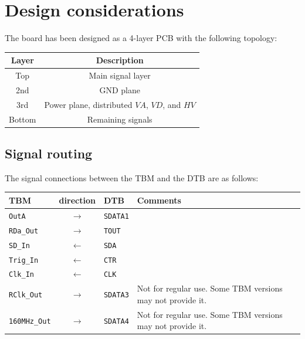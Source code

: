 \chapter{Design considerations}
The board has been designed as a 4-layer PCB with the following topology:
\begin{center}
\begin{tabular}{cc}
	\toprule %
Layer & Description \\
	\midrule %
Top & Main signal layer \\
2nd & GND plane \\
3rd & Power plane, distributed $VA$, $VD$, and $HV$ \\
Bottom & Remaining signals \\
	\bottomrule %
\end{tabular}
\end{center}

\section{Signal routing}

The signal connections between the TBM and the DTB are as follows:
\begin{center}
\begin{tabular}{lcll}
    \toprule %
    TBM & direction & DTB & Comments \\
    \midrule %
    \texttt{OutA}        & $\rightarrow$ & \texttt{SDATA1} & \\
    \texttt{RDa\_Out}    & $\rightarrow$ & \texttt{TOUT}   & \\
    \texttt{SD\_In}      & $\leftarrow$  & \texttt{SDA}    & \\
    \texttt{Trig\_In}    & $\leftarrow$  & \texttt{CTR}    & \\
    \texttt{Clk\_In}     & $\leftarrow$  & \texttt{CLK}    & \\
    \texttt{RClk\_Out}   & $\rightarrow$ & \texttt{SDATA3} & Not for regular use. Some TBM versions may not provide it. \\
    \texttt{160MHz\_Out} & $\rightarrow$ & \texttt{SDATA4} & Not for regular use. Some TBM versions may not provide it. \\
    \bottomrule %
\end{tabular}
\end{center}


